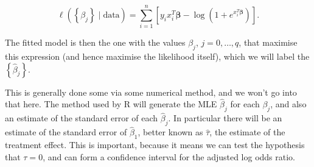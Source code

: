 \documentclass[
  openany]{book}
\theoremstyle{definition}
\theoremstyle{definition}
\theoremstyle{definition}
\theoremstyle{definition}
\theoremstyle{remark}
\begin{document}
\[\ell\left(\left\lbrace\beta_j \right\rbrace\mid{\text{data}}\right) = \sum\limits_{i=1}^n \left[y_i x_i^T\boldsymbol\beta - \log\left(1+e^{x_i^T\boldsymbol\beta}\right)\right].\]

The fitted model is then the one with the values \(\beta_j\), \(j=0,\dots,q\), that maximise this expression (and hence maximise the likelihood itself), which we will label the \(\left\lbrace \hat{\beta}_j\right\rbrace\).

This is generally done some via some numerical method, and we won't go into that here. The method used by R will generate the MLE \(\hat\beta_j\) for each \(\beta_j\), and also an estimate of the standard error of each \(\hat\beta_j\). In particular there will be an estimate of the standard error of \(\hat\beta_1\), better known as \(\hat\tau\), the estimate of the treatment effect. This is important, because it means we can test the hypothesis that \(\tau=0\), and can form a confidence interval for the adjusted log odds ratio.
\end{document}
